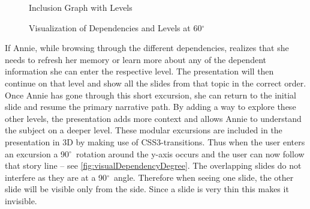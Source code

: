 \documentclass{llncs}
\def\degree{\ensuremath{^\circ}}
\begin{document}
\begin{figure}[ht]\vspace{-1.5em}
  \vspace{-1.5em}
  \caption{Inclusion Graph with Levels}\label{fig:levelsGraph}
\vspace{-2em}
\end{figure}

\begin{figure}\vspace{-2em}
  \vspace{-1.8em}
  \caption{Visualization of Dependencies and Levels at 60\degree}
  \label{fig:visualDependencyDegree}
\vspace{-1.8em}
\end{figure}
If Annie, while browsing through the different dependencies, realizes that she needs to
refresh her memory or learn more about any of the dependent information she can enter the
respective level. The presentation will then continue on that level and show all the
slides from that topic in the correct order. Once Annie has gone through this short
excursion, she can return to the initial slide and resume the primary narrative path. By
adding a way to explore these other levels, the presentation adds more context and allows
Annie to understand the subject on a deeper level. These modular excursions are included
in the presentation in 3D by making use of CSS3-transitions. Thus when the user enters an
excursion a 90\degree\ rotation around the y-axis occurs and the user can now follow that
story line -- see \autoref{fig:visualDependencyDegree}. The overlapping slides do not
interfere as they are at a 90\degree\ angle. Therefore when seeing one slide, the other
slide will be visible only from the side. Since a slide is very thin this makes it
invisible.
\end{document}
